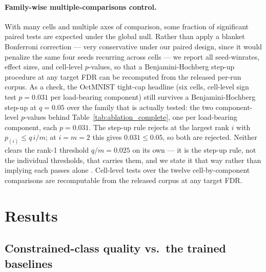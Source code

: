 \documentclass[10pt]{article}
\begin{document}
\paragraph{Family-wise multiple-comparisons control.}
With many cells and multiple axes of comparison, some fraction of significant
paired tests are expected under the global null. Rather than apply a blanket
Bonferroni correction --- very conservative under our paired design, since it
would penalize the same four seeds recurring across cells --- we report all
seed-winrates, effect sizes, and cell-level $p$-values, so that a
Benjamini-Hochberg step-up procedure at any target FDR can be recomputed from
the released per-run corpus. As a check, the OctMNIST tight-cap headline
(six cells, cell-level sign test $p\!=\!0.031$ per load-bearing component)
still survives a Benjamini-Hochberg step-up at $q\!=\!0.05$
%
{over the family that is actually tested: the two component-level
$p$-values behind Table~\ref{tab:ablation_complete}, one per load-bearing
component, each $p\!=\!0.031$. The step-up rule rejects at the largest rank $i$
with $p_{(i)}\!\le\!q\,i/m$; at $i\!=\!m\!=\!2$ this gives
$0.031\!\le\!0.05$, so both are rejected. Neither clears the rank-1 threshold
$q/m\!=\!0.025$ on its own --- it is the step-up rule, not the individual
thresholds, that carries them, and we state it that way rather than implying
each passes alone \citep{benjamini1995controlling}. Cell-level tests over the
twelve cell-by-component comparisons are recomputable from the released corpus
at any target FDR.}

\section{Results}
\label{sec:results}

\subsection{Constrained-class quality vs.\ the trained baselines}
\label{sec:oct}
\end{document}
